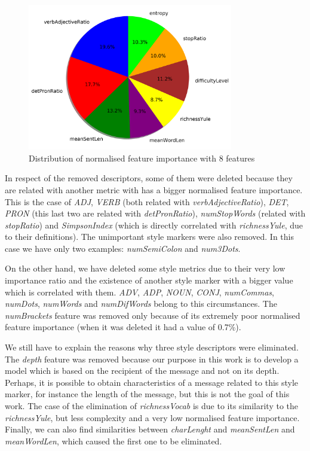 \begin{figure}
	\centering%
	\centerline{\includegraphics[width=0.8\textwidth]{Imagenes/Bitmap/DecisionTrees/pie8.png}}%
	\caption{Distribution of normalised feature importance with 8 features}%
	\label{fig:nfi8}
\end{figure}

In respect of the removed descriptors, some of them were deleted because they are related with another metric with has a bigger normalised feature importance. This is the case of \textit{ADJ}, \textit{VERB} (both related with \textit{verbAdjectiveRatio}), \textit{DET}, \textit{PRON} (this last two are related with \textit{detPronRatio}), \textit{numStopWords} (related with \textit{stopRatio}) and \textit{SimpsonIndex} (which is directly correlated with \textit{richnessYule}, due to their definitions). The unimportant style markers were also removed. In this case we have only two examples: \textit{numSemiColon} and \textit{num3Dots}.

On the other hand, we have deleted some style metrics due to their very low importance ratio and the existence of another style marker with a bigger value which is correlated with them. \textit{ADV}, \textit{ADP}, \textit{NOUN}, \textit{CONJ}, \textit{numCommas}, \textit{numDots}, \textit{numWords} and \textit{numDifWords} belong to this circumstances. The \textit{numBrackets} feature was removed only because of its extremely poor normalised feature importance (when it was deleted it had a value of 0.7\%).

We still have to explain the reasons why three style descriptors were eliminated. The \textit{depth} feature was removed because our purpose in this work is to develop a model which is based on the recipient of the message and not on its depth. Perhaps, it is possible to obtain characteristics of a message related to this style marker, for instance the length of the message, but this is not the goal of this work. The case of the elimination of \textit{richnessVocab} is due to its similarity to the \textit{richnessYule}, but less complexity and a very low normalised feature importance. Finally, we can also find similarities between \textit{charLenght} and \textit{meanSentLen} and \textit{meanWordLen}, which caused the first one to be eliminated.

